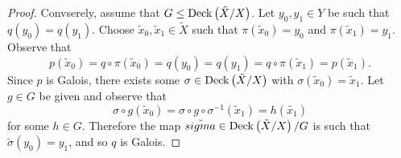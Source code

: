 \documentclass[10pt]{amsart}
\begin{document}
\begin{thm}
\begin{proof}
		Convserely, assume that $G \leq \operatorname{Deck}\left(\tilde{X}/X\right)$.
		Let $y_0, y_1 \in Y$ be such that $q(y_0) = q(y_1)$.
		Choose $\tilde{x}_0, \tilde{x}_1 \in \tilde{X}$ such that $\pi(\tilde{x}_0) = y_0$ and $\pi(\tilde{x}_1) = y_1.$
		Observe that
		$$p(\tilde{x}_0) = q \circ \pi (\tilde{x}_0) = q(y_0) = q(y_1) = q \circ \pi(\tilde{x}_1) = p(\tilde{x}_1).$$
		Since $p$ is Galois, there exists some $\sigma \in \operatorname{Deck}\left(\tilde{X}/X\right)$ with $\sigma(\tilde{x}_0) = \tilde{x}_1$.
		Let $g \in G$ be given and observe that
		$$\sigma \circ g(\tilde{x}_0) = \sigma \circ g \circ \sigma^{-1}(\tilde{x}_1) = h (\tilde{x_1})$$
		for some $h \in G$.
		Therefore the map $\tilde{sigma} \in \operatorname{Deck}\left(\tilde{X}/X\right)/G$ is such that $\tilde{\sigma}(y_0) = y_1$, and so $q$ is Galois.
	\end{proof}
	
\end{thm}
\end{document}

